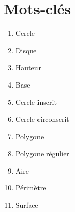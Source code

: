 \documentclass[../../syllabus_1.tex]{subfiles}
\begin{document}
\newpage
\section*{Mots-clés}
\begin{enumerate}[cols=2, label=\textbf{\arabic*.}]
    \item Cercle
    \item Disque
    \item Hauteur
    \item Base
    \item Cercle inscrit
    \item Cercle circonscrit
    \item Polygone
    \item Polygone régulier
    \item Aire
    \item Périmètre
    \item Surface
\end{enumerate}
\end{document}
